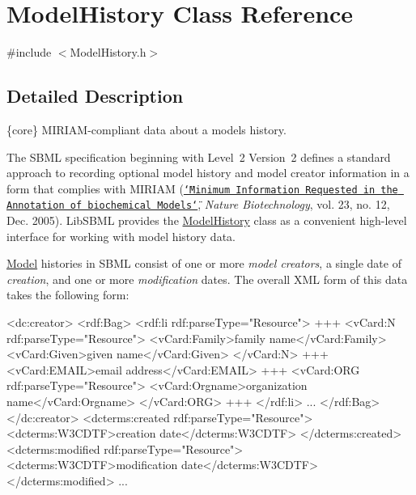 \hypertarget{class_model_history}{}\section{Model\+History Class Reference}
\label{class_model_history}


{\ttfamily \#include $<$Model\+History.\+h$>$}



\subsection{Detailed Description}
\{core\} M\+I\+R\+I\+A\+M-\/compliant data about a model\textquotesingle{}s history.



The S\+B\+ML specification beginning with Level~2 Version~2 defines a standard approach to recording optional model history and model creator information in a form that complies with M\+I\+R\+I\+AM (\href{http://www.nature.com/nbt/journal/v23/n12/abs/nbt1156.html}{\tt \char`\"{}\+Minimum
  Information Requested in the Annotation of biochemical Models\char`\"{}}, {\itshape Nature Biotechnology}, vol. 23, no. 12, Dec. 2005). Lib\+S\+B\+ML provides the \hyperlink{class_model_history}{Model\+History} class as a convenient high-\/level interface for working with model history data.

\hyperlink{class_model}{Model} histories in S\+B\+ML consist of one or more {\itshape model creators}, a single date of {\itshape creation}, and one or more {\itshape modification} dates. The overall X\+ML form of this data takes the following form\+:


\begin{DoxyPre}
<dc:creator>
  <rdf:Bag>
    <rdf:li rdf:parseType="Resource">
      +++
      <vCard:N rdf:parseType="Resource">
        <vCard:Family>family name</vCard:Family>
        <vCard:Given>given name</vCard:Given>
      </vCard:N>
      +++
      <vCard:EMAIL>email address</vCard:EMAIL>
      +++
      <vCard:ORG rdf:parseType="Resource">
       <vCard:Orgname>organization name</vCard:Orgname>
      </vCard:ORG>
      +++
    </rdf:li>
    ...
  </rdf:Bag>
</dc:creator>
<dcterms:created rdf:parseType="Resource">
  <dcterms:W3CDTF>creation date</dcterms:W3CDTF>
</dcterms:created>
<dcterms:modified rdf:parseType="Resource">
  <dcterms:W3CDTF>modification date</dcterms:W3CDTF>
</dcterms:modified>
...
\end{DoxyPre}


